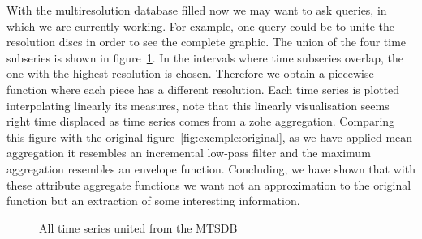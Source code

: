 With the multiresolution database filled now we may want to ask
queries, in which we are currently working.  For example, one query
could be to unite the resolution discs in order to see the complete
graphic.  The union of the four time subseries is shown in
figure~\ref{fig:exemple:4mrdtot}.  In the intervals where time
subseries overlap, the one with the highest resolution is
chosen. Therefore we obtain a piecewise function where each piece has
a different resolution.  Each time series is plotted interpolating
linearly its measures, note that this linearly visualisation seems
right time displaced as time series comes from a zohe aggregation.
Comparing this figure with the original
figure~\ref{fig:exemple:original}, as we have applied mean aggregation
it resembles an incremental low-pass filter and the maximum
aggregation resembles an envelope function. Concluding, we have shown
that with these attribute aggregate functions we want not an
approximation to the original function but an extraction of some
interesting information.




\begin{figure}[tp]
  \centering
  
  \caption{All time series united from the MTSDB}
  \label{fig:exemple:4mrdtot}
\end{figure}



